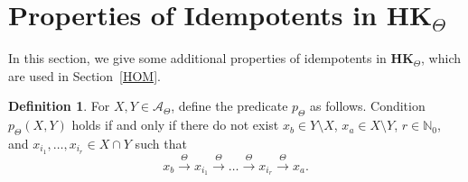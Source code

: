 \documentclass[pdflatex,sn-mathphys-num]{sn-jnl}
\newcommand{\hk}{\mathbf{HK}_{\Theta}}
\newcommand{\tot}{\overset{\Theta}{\to}}
\theoremstyle{definition}
\newtheorem{definition}[theorem]{Definition}
\theoremstyle{remark}
\begin{document}
\section{Properties of Idempotents in $\hk$}\label{PROP}

In this section, we give some additional properties of idempotents in $\hk$, which are used in Section~\ref{HOM}.

\begin{definition}\label{definition:p}
   For $X, Y \in \mathcal{A}_{\Theta}$, define the predicate $p_{\Theta}$ as follows.
   Condition $p_{\Theta}(X, Y)$ holds if and only if there do not exist $x_b \in Y \setminus X$, $x_a \in X \setminus Y$, $r \in \mathbb{N}_0$, and $x_{i_1}, \dots, x_{i_r} \in X \cap Y$ such that 
   \[
   x_b \tot x_{i_1} \tot \dots \tot x_{i_r} \tot x_a.
   \]
\end{definition}
\end{document}
